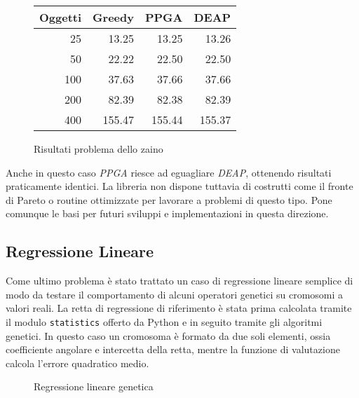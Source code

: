 \begin{figure}[H]
	\centering
	\begin{minipage}{0.45\linewidth}
		\centering
		\begin{tabular}{rrrr}
			\toprule
			Oggetti & Greedy & PPGA   & DEAP   \\
			\midrule
			25      & 13.25  & 13.25  & 13.26  \\
			50      & 22.22  & 22.50  & 22.50  \\
			100     & 37.63  & 37.66  & 37.66  \\
			200     & 82.39  & 82.38  & 82.39  \\
			400     & 155.47 & 155.44 & 155.37 \\
			\bottomrule
		\end{tabular}
	\end{minipage}
	\hfill
	\begin{minipage}{0.5\linewidth}
		\centering
		
	\end{minipage}
	\caption{Risultati problema dello zaino}
	\label{fig: knapsack}
\end{figure}

Anche in questo caso \textit{PPGA} riesce ad eguagliare \textit{DEAP}, ottenendo
risultati praticamente identici. La libreria non dispone tuttavia di costrutti
come il fronte di Pareto o routine ottimizzate per lavorare a problemi di questo
tipo. Pone comunque le basi per futuri sviluppi e implementazioni in questa
direzione.

\subsection{Regressione Lineare}

Come ultimo problema è stato trattato un caso di regressione lineare semplice
di modo da testare il comportamento di alcuni operatori genetici su cromosomi
a valori reali. La retta di regressione di riferimento è stata prima calcolata
tramite il modulo \verb|statistics| offerto da Python e in seguito tramite gli
algoritmi genetici. In questo caso un cromosoma è formato da due soli elementi,
ossia coefficiente angolare e intercetta della retta, mentre la funzione di
valutazione calcola l'errore quadratico medio.


\begin{figure}[H] %
	\centering
	
	\caption{Regressione lineare genetica}
	\label{fig: reg}
\end{figure}

